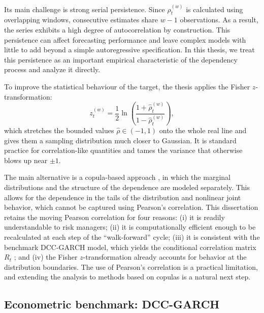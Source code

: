 Its main challenge is strong serial persistence. Since $\hat{\rho}_{t}^{(w)}$ is calculated using overlapping windows, consecutive estimates share $w-1$ observations. As a result, the series exhibits a high degree of autocorrelation by construction. This persistence can affect forecasting performance and leave complex models with little to add beyond a simple autoregressive specification. In this thesis, we treat this persistence as an important empirical characteristic of the dependency process and analyze it directly.

To improve the statistical behaviour of the target, the thesis applies the Fisher $z$-transformation:
\begin{equation}
    z_{t}^{(w)} = \frac{1}{2}\ln\!\left(\frac{1 + \hat{\rho}_{t}^{(w)}}{1 - \hat{\rho}_{t}^{(w)}}\right),
\end{equation}
which stretches the bounded values $\hat{\rho} \in (-1,1)$ onto the whole real line and gives them a sampling distribution much closer to Gaussian. It is standard practice for correlation-like quantities and tames the variance that otherwise blows up near $\pm 1$.

The main alternative is a copula-based approach \cite{patton2006copula}, in which the marginal distributions and the structure of the dependence are modeled separately. This allows for the dependence in the tails of the distribution and nonlinear joint behavior, which cannot be captured using Pearson's correlation. This dissertation retains the moving Pearson correlation for four reasons: (i) it is readily understandable to risk managers; (ii) it is computationally efficient enough to be recalculated at each step of the ``walk-forward'' cycle; (iii) it is consistent with the benchmark DCC-GARCH model, which yields the conditional correlation matrix $R_t$ \cite{engle2001theoretical}; and (iv) the Fisher $z$-transformation already accounts for behavior at the distribution boundaries. The use of Pearson's correlation is a practical limitation, and extending the analysis to methods based on copulas is a natural next step.

\subsection{Econometric benchmark: DCC-GARCH}

